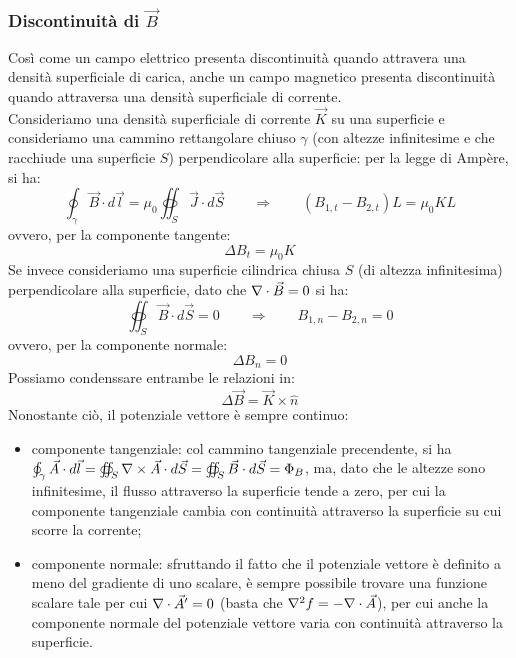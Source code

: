 \subsubsection{Discontinuità di $ \vec{B} $}

Così come un campo elettrico presenta discontinuità quando attravera una densità superficiale di carica, anche un campo magnetico presenta discontinuità quando attraversa una densità superficiale di corrente. \\ 
%
Consideriamo una densità superficiale di corrente $ \vec{K} $ su una superficie e consideriamo una cammino rettangolare chiuso $ \gamma $ (con altezze infinitesime e che racchiude una superficie $ S $) perpendicolare alla superficie: per la legge di Ampère, si ha:
\begin{equation}
	\oint_{\gamma} \vec{B}\cdot d\vec{l} = \mu_0 \oiint_S \vec{J}\cdot d\vec{S} \qquad\Longrightarrow\qquad (B_{1,t} - B_{2,t}) L = \mu_0 KL
	\label{eq:15}
\end{equation}
ovvero, per la componente tangente:
\begin{equation}
	\Delta B_t = \mu_0 K
	\label{eq:16}
\end{equation}
Se invece consideriamo una superficie cilindrica chiusa $ S $ (di altezza infinitesima) perpendicolare alla superficie, dato che $ \nabla\cdot\vec{B} = 0 $ si ha:
\begin{equation}
	\oiint_S \vec{B}\cdot d\vec{S} = 0 \qquad\Longrightarrow\qquad B_{1,n} - B_{2,n} = 0 
	\label{eq:17}
\end{equation}
ovvero, per la componente normale:
\begin{equation}
	\Delta B_n = 0 
	\label{eq:18}
\end{equation}
Possiamo condenssare entrambe le relazioni in:
\begin{equation}
	\Delta\vec{B} = \vec{K}\times\hat{n}
	\label{eq:19}
\end{equation}
Nonostante ciò, il potenziale vettore è sempre continuo:
\begin{itemize}
	\item componente tangenziale: col cammino tangenziale precendente, si ha $ \oint_{\gamma} \vec{A}\cdot d\vec{l} = \oiint_S \nabla\times\vec{A}\cdot d\vec{S} = \oiint_S \vec{B}\cdot d\vec{S} = \Phi_B $, ma, dato che le altezze sono infinitesime, il flusso attraverso la superficie tende a zero, per cui la componente tangenziale cambia con continuità attraverso la superficie su cui scorre la corrente;
	\item componente normale: sfruttando il fatto che il potenziale vettore è definito a meno del gradiente di uno scalare, è sempre possibile trovare una funzione scalare tale per cui $ \nabla\cdot\vec{A}' = 0 $ (basta che $ \nabla^2 f = -\nabla\cdot\vec{A} $), per cui anche la componente normale del potenziale vettore varia con continuità attraverso la superficie.
\end{itemize}

